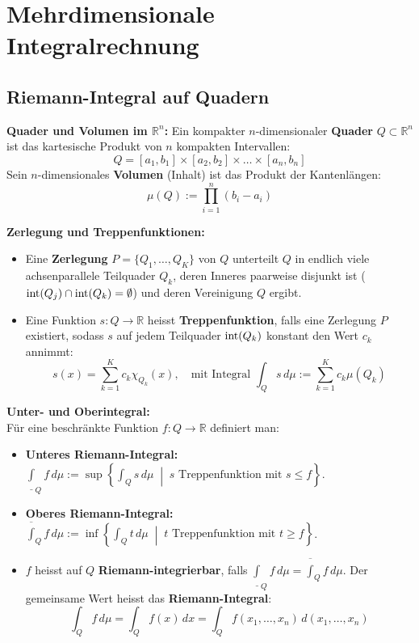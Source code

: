 \section{Mehrdimensionale Integralrechnung}

\subsection{Riemann-Integral auf Quadern}

\begin{definition}
    \textbf{Quader und Volumen im $\mathbb{R}^n$:}
    Ein kompakter $n$-dimensionaler \textbf{Quader} $Q \subset \mathbb{R}^n$ ist das kartesische Produkt von $n$ kompakten Intervallen:
    $$ Q = [a_1, b_1] \times [a_2, b_2] \times \dots \times [a_n, b_n] $$
    Sein $n$-dimensionales \textbf{Volumen} (Inhalt) ist das Produkt der Kantenlängen:
    $$ \mu(Q) := \prod_{i=1}^n (b_i - a_i) $$
\end{definition}

\begin{definition}
    \textbf{Zerlegung und Treppenfunktionen:}
    \begin{itemize}
        \item Eine \textbf{Zerlegung} $P = \{Q_1, \dots, Q_K\}$ von $Q$ unterteilt $Q$ in endlich viele achsenparallele Teilquader $Q_k$, deren Inneres paarweise disjunkt ist ($\operatorname{int}(Q_j) \cap \operatorname{int}(Q_k) = \emptyset$) und deren Vereinigung $Q$ ergibt.
        \item Eine Funktion $s: Q \to \mathbb{R}$ heisst \textbf{Treppenfunktion}, falls eine Zerlegung $P$ existiert, sodass $s$ auf jedem Teilquader $\operatorname{int}(Q_k)$ konstant den Wert $c_k$ annimmt:
        $$ s(x) = \sum_{k=1}^K c_k \chi_{Q_k}(x), \quad \text{mit Integral } \int_Q s \, d\mu := \sum_{k=1}^K c_k \mu(Q_k) $$
    \end{itemize}
\end{definition}

\begin{definition}
    \textbf{Unter- und Oberintegral:} \\
    Für eine beschränkte Funktion $f: Q \to \mathbb{R}$ definiert man:
    \begin{itemize}
        \item \textbf{Unteres Riemann-Integral:} $\underline{\int}_Q f \, d\mu := \sup \left\{ \int_Q s \, d\mu \;\middle|\; s \text{ Treppenfunktion mit } s \le f \right\}$.
        \item \textbf{Oberes Riemann-Integral:} $\overline{\int}_Q f \, d\mu := \inf \left\{ \int_Q t \, d\mu \;\middle|\; t \text{ Treppenfunktion mit } t \ge f \right\}$.
        \item $f$ heisst auf $Q$ \textbf{Riemann-integrierbar}, falls $\underline{\int}_Q f \, d\mu = \overline{\int}_Q f \, d\mu$. Der gemeinsame Wert heisst das \textbf{Riemann-Integral}:
        $$ \int_Q f \, d\mu = \int_Q f(x) \, dx = \int_Q f(x_1, \dots, x_n) \, d(x_1, \dots, x_n) $$
    \end{itemize}
\end{definition}

